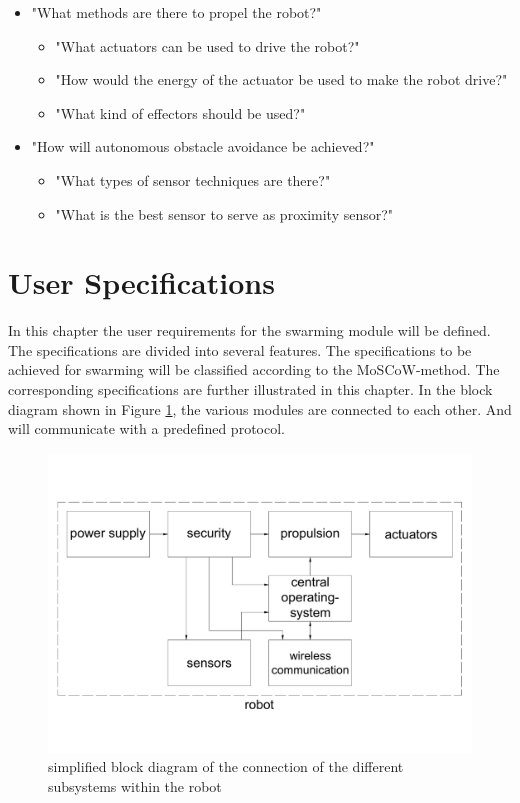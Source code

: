 \documentclass[10pt,a4paper]{article}
\begin{document}
\begin{itemize}
\begin{itemize}
    \end{itemize}
    \item "What methods are there to propel the robot?"
    \begin{itemize}
        \item "What actuators can be used to drive the robot?"
        \item "How would the energy of the actuator be used to make the robot drive?"
        \item "What kind of effectors should be used?"
    \end{itemize}
    \item "How will autonomous obstacle avoidance be achieved?"
    \begin{itemize}
   		 \item "What types of sensor techniques are there?"
   		 \item "What is the best sensor to serve as proximity sensor?"
    \end{itemize}
\end{itemize}
\newpage

\section{User Specifications}
In this chapter the user requirements for the swarming module will be defined. The specifications are divided into several features. The specifications to be achieved for swarming will be classified according to the MoSCoW-method. The corresponding specifications are further illustrated in this chapter. In the block diagram shown in Figure  \ref{fig:blockschematic}, the various modules are connected to each other. And will communicate with a predefined protocol.



\begin{figure}[h]
    \centering
    \includegraphics[width=1\textwidth]{blockschematic}
    \caption{simplified block diagram of the connection of the different subsystems within the robot }
    \label{fig:blockschematic}
\end{figure}
\end{document}
